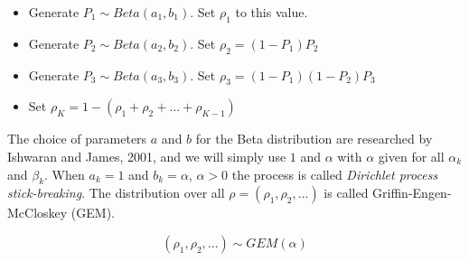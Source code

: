\documentclass{article}
\begin{document}
\begin{itemize}
    \item Generate $P_{1} \sim Beta(a_{1}, b_{1})$. Set $\rho_{1}$ to this value.  
    \item Generate $P_{2} \sim Beta(a_{2}, b_{2})$. Set $\rho_{2} = (1 - P_{1})P_{2}$
    \item Generate $P_{3} \sim Beta(a_{3}, b_{3})$. Set $\rho_{3} = (1 - P_{1})(1-P_{2})P_{3}$
    \item Set $\rho_{K} = 1 - (\rho_{1} + \rho_{2} + ... + \rho_{K-1})$
\end{itemize}

The choice of parameters $a$ and $b$ for the Beta distribution are researched by Ishwaran and James, 2001, and we will simply use $1$ and $\alpha$ with $\alpha$ given for all $\alpha_{k}$ and $\beta_{k}$. 
When $a_{k}=1$ and $b_{k}=\alpha$, $\alpha > 0$ the process is called \textit{Dirichlet process stick-breaking}. The distribution over all $\rho = (\rho_{1}, \rho_{2}, ...)$ is called Griffin-Engen-McCloskey (GEM). 

$$ (\rho_{1}, \rho_{2}, ...) \sim GEM(\alpha)$$
\end{document}
